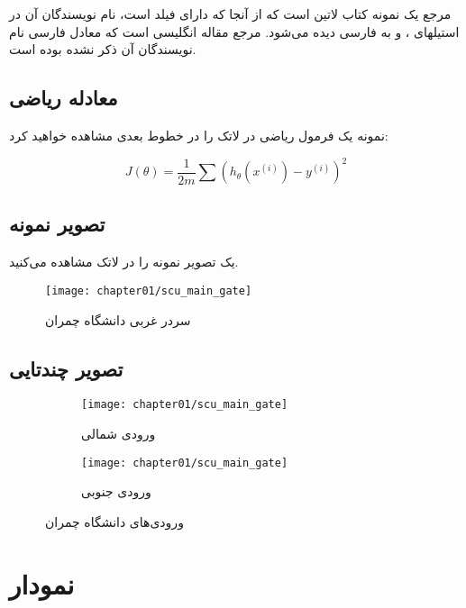 مرجع \cite{Gonzalez02book} یک نمونه کتاب لاتین است که از آنجا که دارای فیلد  است، نام نویسندگان آن در استیلهای ،  و  به فارسی دیده می‌شود. مرجع \cite{Baker02limits} مقاله انگلیسی است که معادل فارسی نام نویسندگان آن ذکر نشده بوده است.



\subsection{معادله ریاضی}\label{sec:math-equation}
نمونه یک فرمول ریاضی در لاتک را در خطوط بعدی مشاهده خواهید کرد:

\begin{equation}
	\label{eq:a}
    J(\theta)=\frac{1}{2 m} \sum\left(h_{\theta}\left(x^{(i)}\right)-y^{(i)}\right)^{2}
\end{equation}

\subsection{تصویر نمونه}\label{sec:sample-image}
یک تصویر نمونه را در لاتک مشاهده می‌کنید.

\begin{figure}[H]
    \label{fig:main-gate}
    \texttt{[image: chapter01/scu\_main\_gate]}
    \caption{سردر غربی دانشگاه چمران}
\end{figure}

\subsection{تصویر چندتایی}\label{sec:multi-image}
\begin{figure}[H]
	\begin{subfigure}[t]{5cm}
		\centering
		\texttt{[image: chapter01/scu\_main\_gate]}
		\caption{ورودی شمالی}\label{fig:1a}		
	\end{subfigure}
	\quad
	\begin{subfigure}[t]{5cm}
		\centering
		\texttt{[image: chapter01/scu\_main\_gate]}
		\caption{ورودی جنوبی}\label{fig:1b}
	\end{subfigure}
	\caption{ورودی‌های دانشگاه چمران}\label{fig:1}
\end{figure}


\section{نمودار}

